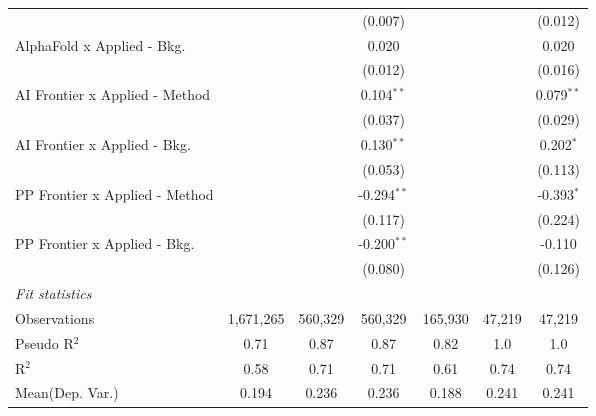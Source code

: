 \begin{tabular}{lcccccc}
                                  &                &                & (0.007)        &                &                & (0.012)\\   
   AlphaFold x Applied - Bkg.     &                &                & 0.020          &                &                & 0.020\\   
                                  &                &                & (0.012)        &                &                & (0.016)\\   
   AI Frontier x Applied - Method &                &                & 0.104$^{**}$   &                &                & 0.079$^{**}$\\   
                                  &                &                & (0.037)        &                &                & (0.029)\\   
   AI Frontier x Applied - Bkg.   &                &                & 0.130$^{**}$   &                &                & 0.202$^{*}$\\   
                                  &                &                & (0.053)        &                &                & (0.113)\\   
   PP Frontier x Applied - Method &                &                & -0.294$^{**}$  &                &                & -0.393$^{*}$\\   
                                  &                &                & (0.117)        &                &                & (0.224)\\   
   PP Frontier x Applied - Bkg.   &                &                & -0.200$^{**}$  &                &                & -0.110\\   
                                  &                &                & (0.080)        &                &                & (0.126)\\   
   \midrule
   \emph{Fit statistics}\\
   Observations                   & 1,671,265      & 560,329        & 560,329        & 165,930        & 47,219         & 47,219\\  
   Pseudo R$^2$                   & 0.71           & 0.87           & 0.87           & 0.82           & 1.0            & 1.0\\  
   R$^2$                          & 0.58           & 0.71           & 0.71           & 0.61           & 0.74           & 0.74\\  
Mean(Dep. Var.) & 0.194 & 0.236 & 0.236 & 0.188 & 0.241 & 0.241 \\
   

\end{tabular}
